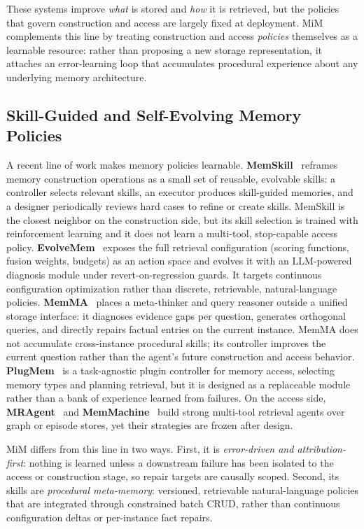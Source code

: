 \documentclass[11pt]{article}
\begin{document}
These systems improve \emph{what} is stored and \emph{how} it is retrieved, but
the policies that govern construction and access are largely fixed at deployment.
MiM complements this line by treating construction and access \emph{policies}
themselves as a learnable resource: rather than proposing a new storage
representation, it attaches an error-learning loop that accumulates procedural
experience about any underlying memory architecture.

\subsection{Skill-Guided and Self-Evolving Memory Policies}
\label{sec:rw-self}

A recent line of work makes memory policies learnable. \textbf{MemSkill}~\cite{zhang2026memskill}
reframes memory construction operations as a small set of reusable, evolvable
skills: a controller selects relevant skills, an executor produces skill-guided
memories, and a designer periodically reviews hard cases to refine or create
skills. MemSkill is the closest neighbor on the construction side, but its skill
selection is trained with reinforcement learning and it does not learn a
multi-tool, stop-capable access policy. \textbf{EvolveMem}~\cite{liu2026evolvemem}
exposes the full retrieval configuration (scoring functions, fusion weights,
budgets) as an action space and evolves it with an LLM-powered diagnosis module
under revert-on-regression guards. It targets continuous configuration
optimization rather than discrete, retrievable, natural-language policies.
\textbf{MemMA}~\cite{memma2026} places a meta-thinker and query reasoner outside
a unified storage interface: it diagnoses evidence gaps per question, generates
orthogonal queries, and directly repairs factual entries on the current instance.
MemMA does not accumulate cross-instance procedural skills; its controller
improves the current question rather than the agent's future construction and
access behavior. \textbf{PlugMem}~\cite{plugmem2026} is a task-agnostic plugin
controller for memory access, selecting memory types and planning retrieval, but
it is designed as a replaceable module rather than a bank of experience learned
from failures. On the access side, \textbf{MRAgent}~\cite{ji2026mragent} and
\textbf{MemMachine}~\cite{memmachine2026} build strong multi-tool retrieval
agents over graph or episode stores, yet their strategies are frozen after
design.

MiM differs from this line in two ways. First, it is \emph{error-driven and
attribution-first}: nothing is learned unless a downstream failure has been
isolated to the access or construction stage, so repair targets are causally
scoped. Second, its skills are \emph{procedural meta-memory}: versioned,
retrievable natural-language policies that are integrated through constrained
batch CRUD, rather than continuous configuration deltas or per-instance fact
repairs.
\end{document}
